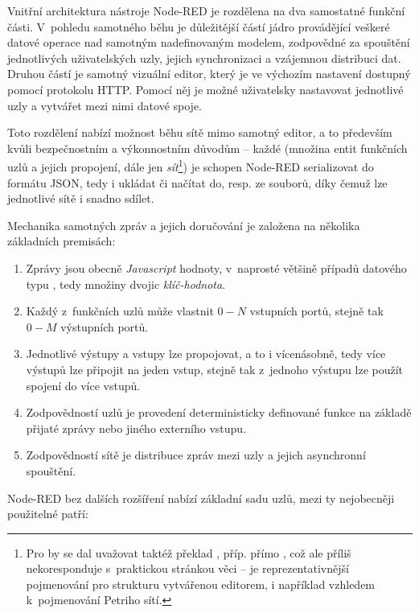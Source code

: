 Vnitřní architektura nástroje Node-RED je rozdělena na dva samostatné funkční části.
V~pohledu samotného běhu je důležitější částí jádro provádějící veškeré datové operace nad samotným nadefinovaným
modelem, zodpovědné za spouštění jednotlivých uživatelských uzly, jejich synchronizaci a vzájemnou distribuci dat.
Druhou částí je samotný vizuální editor, který je ve výchozím nastavení dostupný pomocí protokolu HTTP. Pomocí něj je
možné uživatelsky nastavovat jednotlivé uzly a vytvářet mezi nimi datové spoje.

Toto rozdělení nabízí možnost běhu sítě mimo samotný editor, a to především kvůli bezpečnostním a
výkonnostním důvodům -- každé  (množina entit funkčních uzlů a jejich propojení, dále jen
\emph{sít}\footnote{Pro  by se dal uvažovat taktéž překlad ,
příp. přímo , což ale příliš nekoresponduje s~praktickou stránkou věci --  je reprezentativnější
pojmenování pro strukturu vytvářenou editorem, i například vzhledem k~pojmenování Petriho sítí.}) je schopen
Node-RED serializovat do formátu JSON, tedy i ukládat či načítat do, resp. ze souborů, díky čemuž lze jednotlivé
sítě i snadno sdílet.

Mechanika samotných zpráv a jejich doručování je založena na několika základních premisách:
\begin{enumerate}
    \item Zprávy jsou obecně \emph{Javascript} hodnoty, v~naprosté většině případů datového typu ,
    tedy množiny dvojic \emph{klíč-hodnota}.
    \item Každý z~funkčních uzlů může vlastnit $0-N$ vstupních portů, stejně tak $0-M$ výstupních portů.
    \item Jednotlivé výstupy a vstupy lze propojovat, a to i vícenásobně, tedy více výstupů lze připojit na jeden vstup,
    stejně tak z~jednoho výstupu lze použít spojení do více vstupů.
    \item Zodpovědností uzlů je provedení deterministicky definované funkce na základě přijaté zprávy nebo
    jiného externího vstupu.
    \item Zodpovědností sítě je distribuce zpráv mezi uzly a jejich asynchronní spouštění.
\end{enumerate}

Node-RED bez dalších rozšíření nabízí základní sadu uzlů, mezi ty nejobecněji použitelné patří:

